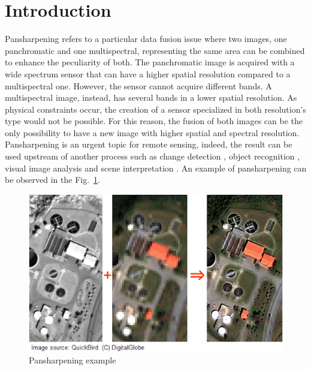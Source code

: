 \documentclass[12pt]{report}
\begin{document}
\chapter*{Introduction}
Pansharpening refers to a particular data fusion issue where two images, one panchromatic and one multispectral, representing the same area can be combined to enhance the peculiarity of both. The panchromatic image is acquired with a wide spectrum sensor that can have a higher spatial resolution compared to a multispectral one. However, the sensor cannot acquire different bands. A multispectral image, instead, has several bands in a lower spatial resolution. As physical constraints occur, the creation of a sensor specialized in both resolution's type would not be possible. For this reason, the fusion of both images can be the only possibility to have a new image with higher spatial and spectral resolution. Pansharpening is an urgent topic for remote sensing, indeed, the result can be used upstream of another process such as change detection \cite{changedetection}, object recognition \cite{objectrecognition}, visual image analysis and scene interpretation \cite{sceneinterp}.
An example of pansharpening can be observed in the Fig.~\ref{fig:pansh}.

\begin{figure}[t]
    \centering
    \includegraphics[scale=.7]{pansharpeningexample.png}
		\caption{Pansharpening example}
		\label{fig:pansh}
\end{figure}
\end{document}
